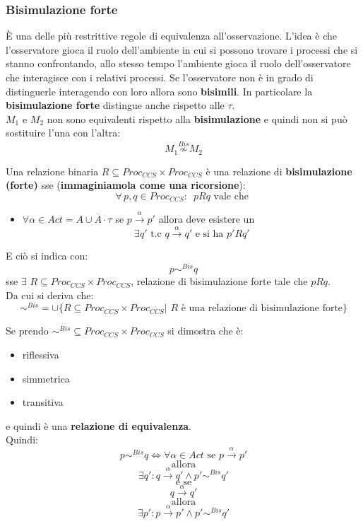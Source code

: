 \subsubsection{Bisimulazione forte}
È una delle più restrittive regole di equivalenza all'osservazione. L'idea è che l'osservatore gioca il ruolo dell'ambiente in cui si possono trovare i processi che si stanno confrontando, allo stesso tempo l'ambiente gioca il ruolo dell'osservatore che interagisce con i relativi processi. Se l'osservatore non è in grado di distinguerle interagendo con loro allora sono \textbf{bisimili}. In particolare la \textbf{bisimulazione forte} distingue anche rispetto alle $\tau$.\\ $M_1$ e $M_2$ non sono equivalenti rispetto alla \textbf{bisimulazione} e quindi non
si può sostituire l'una con l'altra:
\[M_1\stackrel{Bis}{\not\sim}M_2\]
\begin{definizione}
  Una relazione binaria $R\subseteq Proc_{CCS}\times Proc_{CCS}$ è una
  relazione di \textbf{bisimulazione (forte)} sse (\textbf{immaginiamola come una ricorsione}):
  \[\forall\, p, q\in Proc_{CCS}:\,\,\, pRq \mbox{ vale che }\]
  \begin{itemize}
    \item $\forall \alpha\in Act=A\cup \overline{A}\cdot \tau$ se
    $p\stackrel{\alpha}{\rightarrow}p'$ allora deve esistere un \[\exists
    q'\mbox{ t.c }q\stackrel{\alpha}{\rightarrow}q'\mbox{ e si ha }p'Rq'\]
\end{itemize}
E ciò si indica con:
\[p\sim^{Bis}q\]
sse $\exists\,\, R\subseteq Proc_{CCS}\times Proc_{CCS}$, relazione di
bisimulazione forte tale che $pRq$.\\
Da cui si deriva che:
\[\sim^{Bis}=\cup\{R\subseteq Proc_{CCS}\times Proc_{CCS}|\,\, R \mbox{ è una
    relazione di bisimulazione forte}\}\]
\end{definizione} \vspace{5mm} %
\begin{definizione}
  Se prendo $\sim^{Bis}\subseteq Proc_{CCS}\times Proc_{CCS}$ si dimostra che è:
  \begin{itemize}
    \item riflessiva
    \item simmetrica
    \item transitiva
  \end{itemize}
  e quindi è una \textbf{relazione di equivalenza}.\\
  Quindi:
  \[p\sim^{Bis}q\iff \forall\alpha\in Act \mbox{ se }
    p\stackrel{\alpha}{\rightarrow}p'\]
  \[\mbox{ allora }\]
  \[\exists q': q\stackrel{\alpha}{\rightarrow}q'\land p'\sim^{Bis}q'\]
  \[\mbox{ e se }\]
  \[q\stackrel{\alpha}{\rightarrow}q' \]
  \[\mbox{ allora }\]
  \[\exists p': p\stackrel{\alpha}{\rightarrow}p'\land p'\sim^{Bis}q'\]
  
\end{definizione} \vspace{5mm} %
